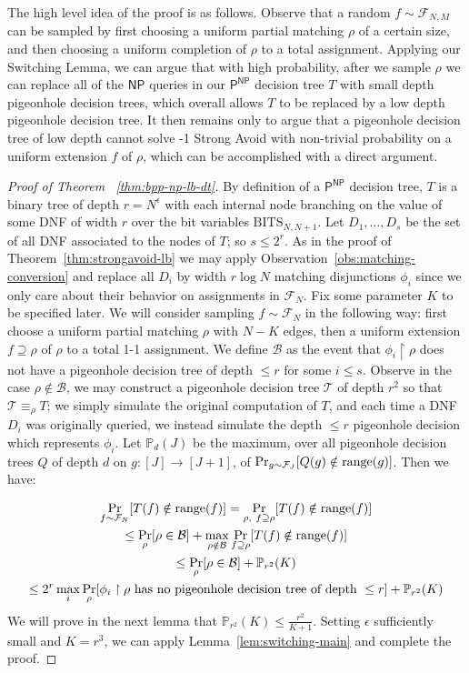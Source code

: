 The high level idea of the proof is as follows. Observe that a random $f \sim \mathcal{F}_{N,M}$ can be sampled by first choosing a uniform partial matching $\rho$ of a certain size, and then choosing a uniform completion of $\rho$ to a total assignment. Applying our Switching Lemma, we can argue that with high probability, after we sample $\rho$ we can replace all of the $\mathsf{NP}$ queries in our $\mathsf{P^{NP}}$ decision tree $T$ with small depth pigeonhole decision trees, which overall allows $T$ to be replaced by a low depth pigeonhole decision tree. It then remains only to argue that a pigeonhole decision tree of low depth cannot solve {-1 Strong Avoid} with non-trivial probability on a uniform extension $f$ of $\rho$, which can be accomplished with a direct argument.
\begin{proof}[Proof of Theorem ~\ref{thm:bpp-np-lb-dt}]
By definition of a $\mathsf{P^{NP}}$ decision tree, $T$ is a binary tree of depth $r = N^{\epsilon}$ with each internal node branching on the value of some DNF of width $r$ over the bit variables $\mathrm{BITS}_{N,N+1}$. Let $D_1,\ldots,D_s$ be the set of all DNF associated to the nodes of $T$; so $s \leq 2^r$. As in the proof of Theorem~\ref{thm:strongavoid-lb} we may apply Observation~\ref{obs:matching-conversion} and replace all $D_i$ by width $r\log N$ matching disjunctions $\phi_i$ since we only care about their behavior on assignments in $\mathcal{F}_N$. Fix some parameter $K$ to be specified later. We will consider sampling $f \sim \mathcal{F}_N$ in the following way: first choose a uniform partial matching $\rho$ with $N-K$ edges, then a uniform extension $f \supseteq \rho$ of $\rho$ to a total 1-1 assignment. We define $\mathcal{B}$ as the event that $\phi_i \upharpoonright \rho$ does not have a pigeonhole decision tree of depth $\leq r$ for some $i \leq s$. Observe in the case $\rho \notin \mathcal{B}$, we may construct a pigeonhole decision tree $\mathcal{T}$ of depth $r^2$ so that $\mathcal{T} \equiv_{\rho} T$; we simply simulate the original computation of $T$, and each time a DNF $D_i$ was originally queried, we instead simulate the depth $\leq r$ pigeonhole decision which represents $\phi_i$. Let $\mathbb{P}_d(J)$ be the maximum, over all pigeonhole decision trees $Q$ of depth $d$ on $g: [J] \to [J+1]$, of $\Pr_{g \sim \mathcal{F}_J}[Q(g) \notin \mathrm{range}(g)]$. Then we have: 

\begin{gather*}
\Pr_{f \sim \mathcal{F}_N} [T(f) \notin \mathrm{range}(f)] = \Pr_{\rho,~f \supseteq \rho } [T(f) \notin \mathrm{range}(f)] \\ \leq \Pr_{\rho}[\rho \in \mathcal{B}] + \max_{\rho \notin \mathcal{B}}\Pr_{f \supseteq \rho}[T(f) \notin \mathrm{range}(f)]\\
\leq \Pr_{\rho}[\rho \in \mathcal{B}] + \mathbb{P}_{r^2}(K)\\
\leq 2^r \max_i \Pr_{\rho}[\phi_i\upharpoonright \rho \text{ has no pigeonhole decision tree of depth } \leq r] + \mathbb{P}_{r^2}(K)
\end{gather*}
We will prove in the next lemma that $\mathbb{P}_{r^2}(K) \leq \frac{r^2}{K+1}$. Setting $\epsilon$ sufficiently small and $K = r^3$, we can apply Lemma~\ref{lem:switching-main} and complete the proof.
\end{proof}

